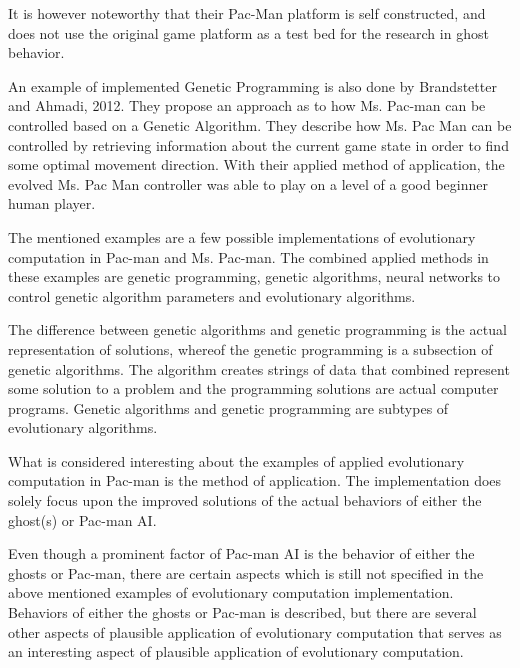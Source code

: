 It is however noteworthy that their Pac-Man platform is self constructed, and does not use the original game platform as a test bed for the research in ghost behavior.

An example of implemented Genetic Programming is also done by Brandstetter and Ahmadi, 2012. They propose an approach as to how Ms. Pac-man can be controlled based on a Genetic Algorithm.
They describe how Ms. Pac Man can be controlled by retrieving information about the current game state in order to find some optimal movement direction.
With their applied method of application, the evolved Ms. Pac Man controller was able to play on a level of a good beginner human player. \cite{Brandstetter2012}

The mentioned examples are a few possible implementations of evolutionary computation in Pac-man and Ms. Pac-man. The combined applied methods in these examples are genetic programming, genetic algorithms, neural networks to control genetic algorithm parameters and evolutionary algorithms.

The difference between genetic algorithms and genetic programming is the actual representation of solutions, whereof the genetic programming is a subsection of genetic algorithms. The algorithm creates strings of data that combined represent some solution to a problem and the programming solutions are actual computer programs.\cite{genetic}
Genetic algorithms and genetic programming are subtypes of evolutionary algorithms.

What is considered interesting about the examples of applied evolutionary computation in Pac-man is the method of application. The implementation does solely focus upon the improved solutions of the actual behaviors of either the ghost(s) or Pac-man AI.

Even though a prominent factor of Pac-man AI is the behavior of either the ghosts or Pac-man, there are certain aspects which is still not specified in the above mentioned examples of evolutionary computation implementation. Behaviors of either the ghosts or Pac-man is described, but there are several other aspects of plausible application of evolutionary computation that serves as an interesting aspect of plausible application of evolutionary computation.